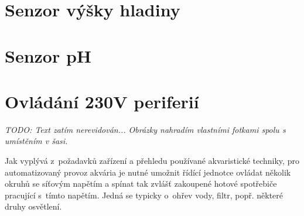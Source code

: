 \begin{table}[h]
\begin{tabular}{|l|l|l|l|l|}
            \end{tabular}
        
    \end{table}





\section{Senzor výšky hladiny}
\label{sec:perif-sensor-hladina}

\section{Senzor pH}
\label{sec:perif-sensor-ph}

\section{Ovládání 230V periferií}
\label{sec:perif-230v}
   \textit{    TODO: Text zatím nerevidován... Obrázky nahradím vlastními fotkami spolu s umístěním v šasi. } 

Jak vyplývá z~požadavků zařízení a přehledu používané akvaristické techniky, pro automatizovaný provoz akvária je nutné umožnit řídící jednotce ovládat několik okruhů se síťovým napětím a spínat tak zvlášť zakoupené hotové spotřebiče pracující s~tímto napětím. Jedná se typicky o~ohřev vody, filtr, popř. některé druhy osvětlení. 

